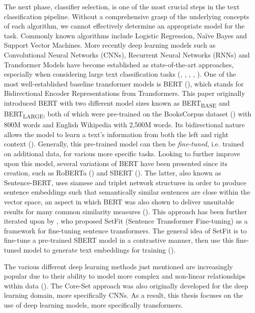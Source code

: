 \documentclass[english,bachelor,ul]{webisthesis} %
\begin{document}
The next phase, classifier selection, is one of the most crucial steps in the text classification pipeline. Without a comprehensive grasp of the underlying concepts of each algorithm, we cannot effectively determine an appropriate model for the task. Commonly known algorithms include Logistic Regression, Na\"ive Bayes and Support Vector Machines. More recently deep learning models such as Convolutional Neural Networks (CNNs), Recurrent Neural Networks (RNNs) and Transformer Models have become established as state-of-the-art approaches, especially when considering large text classification tasks (\cite{chen2015convolutional}, \cite{DBLP:conf/ijcai/LiuQH16}, \cite{DBLP:conf/aaai/LaiXLZ15}, \cite{DBLP:conf/naacl/DevlinCLT19}, \cite{DBLP:conf/cncl/SunQXH19}). One of the most well-established baseline transformer models is BERT (\cite{DBLP:conf/naacl/DevlinCLT19}), which stands for Bidirectional Encoder Representations from Transformers. This paper originally introduced BERT with two different model sizes known as BERT\textsubscript{BASE} and BERT\textsubscript{LARGE}, both of which were pre-trained on the BooksCorpus dataset (\cite{DBLP:conf/iccv/ZhuKZSUTF15}) with 800M words and English Wikipedia with 2,500M words. 
Its bidirectional nature allows the model to learn a text's information from both the left and right context (\cite{DBLP:conf/naacl/DevlinCLT19}). Generally, this pre-trained model can then be \textit{fine-tuned}, i.e. trained on additional data, for various more specific tasks. Looking to further improve upon this model, several variations of BERT have been presented since its creation, such as RoBERTa (\cite{DBLP:journals/corr/abs-1907-11692}) and SBERT (\cite{DBLP:conf/emnlp/ReimersG19}). The latter, also known as Sentence-BERT, uses siamese and triplet network structures in order to produce sentence embeddings such that semantically similar sentences are close within the vector space, an aspect in which BERT was also shown to deliver unsuitable results for many common similarity measures (\cite{DBLP:conf/emnlp/ReimersG19}). This approach has been further iterated upon by \cite{DBLP:setfit}, who proposed SetFit (Sentence Transformer Fine-tuning) as a framework for fine-tuning sentence transformers. The general idea of SetFit is to fine-tune a pre-trained SBERT model in a contrastive manner, then use this fine-tuned model to generate text embeddings for training (\cite{DBLP:setfit}). 

The various different deep learning methods just mentioned are increasingly popular due to their ability to model more complex and non-linear relationships within data (\cite{DBLP:journals/nature/LeCunBH15}).
The Core-Set approach was also originally developed for the deep learning domain, more specifically CNNs. As a result, this thesis focuses on the use of deep learning models, more specifically transformers.
\end{document}
